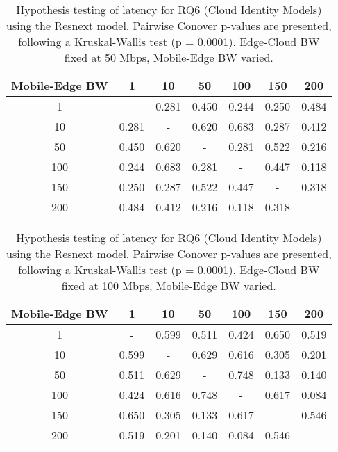 \begin{table}[H]
\caption{Hypothesis testing of latency for RQ6 (Cloud Identity Models) using the Resnext model. Pairwise Conover p-values are presented, following a Kruskal-Wallis test (p = 0.0001). Edge-Cloud BW fixed at 50 Mbps, Mobile-Edge BW varied.}
\centering
\begin{tabular}{c|cccccc}
Mobile-Edge BW & 1 & 10 & 50 & 100 & 150 & 200 \\
\hline
1 & - & 0.281 & 0.450 & 0.244 & 0.250 & 0.484 \\
10 & 0.281 & - & 0.620 & 0.683 & 0.287 & 0.412 \\
50 & 0.450 & 0.620 & - & 0.281 & 0.522 & 0.216 \\
100 & 0.244 & 0.683 & 0.281 & - & 0.447 & 0.118 \\
150 & 0.250 & 0.287 & 0.522 & 0.447 & - & 0.318 \\
200 & 0.484 & 0.412 & 0.216 & 0.118 & 0.318 & - \\
\end{tabular}
\end{table}

\begin{table}[H]
\caption{Hypothesis testing of latency for RQ6 (Cloud Identity Models) using the Resnext model. Pairwise Conover p-values are presented, following a Kruskal-Wallis test (p = 0.0001). Edge-Cloud BW fixed at 100 Mbps, Mobile-Edge BW varied.}
\centering
\begin{tabular}{c|cccccc}
Mobile-Edge BW & 1 & 10 & 50 & 100 & 150 & 200 \\
\hline
1 & - & 0.599 & 0.511 & 0.424 & 0.650 & 0.519 \\
10 & 0.599 & - & 0.629 & 0.616 & 0.305 & 0.201 \\
50 & 0.511 & 0.629 & - & 0.748 & 0.133 & 0.140 \\
100 & 0.424 & 0.616 & 0.748 & - & 0.617 & 0.084 \\
150 & 0.650 & 0.305 & 0.133 & 0.617 & - & 0.546 \\
200 & 0.519 & 0.201 & 0.140 & 0.084 & 0.546 & - \\
\end{tabular}
\end{table}

